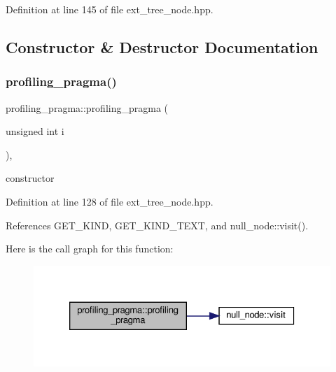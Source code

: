 Definition at line 145 of file ext\+\_\+tree\+\_\+node.\+hpp.



\subsection{Constructor \& Destructor Documentation}
\mbox{\label{structprofiling__pragma_a61742688d18ab286f44773b411b277fb}} 
\subsubsection{\texorpdfstring{profiling\+\_\+pragma()}{profiling\_pragma()}}
{\footnotesize\ttfamily profiling\+\_\+pragma\+::profiling\+\_\+pragma (\begin{DoxyParamCaption}\item[{unsigned int}]{i }\end{DoxyParamCaption})\hspace{0.3cm}{\ttfamily [inline]}, {\ttfamily [explicit]}}



constructor 



Definition at line 128 of file ext\+\_\+tree\+\_\+node.\+hpp.



References G\+E\+T\+\_\+\+K\+I\+ND, G\+E\+T\+\_\+\+K\+I\+N\+D\+\_\+\+T\+E\+XT, and null\+\_\+node\+::visit().

Here is the call graph for this function\+:
\nopagebreak
\begin{figure}[H]
\begin{center}
\leavevmode
\includegraphics[width=326pt]{d9/d08/structprofiling__pragma_a61742688d18ab286f44773b411b277fb_cgraph}
\end{center}
\end{figure}


